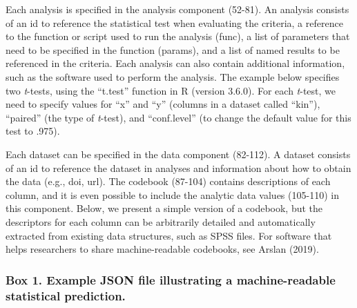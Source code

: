 \documentclass[doc,floatsintext]{apa6}
\begin{document}
Each analysis is specified in the analysis component (52-81). An analysis consists of an id to reference the statistical test when evaluating the criteria, a reference to the function or script used to run the analysis (func), a list of parameters that need to be specified in the function (params), and a list of named results to be referenced in the criteria. Each analysis can also contain additional information, such as the software used to perform the analysis. The example below specifies two \emph{t}-tests, using the \enquote{t.test} function in R (version 3.6.0). For each \emph{t}-test, we need to specify values for \enquote{x} and \enquote{y} (columns in a dataset called \enquote{kin}), \enquote{paired} (the type of \emph{t}-test), and \enquote{conf.level} (to change the default value for this test to .975).

Each dataset can be specified in the data component (82-112). A dataset consists of an id to reference the dataset in analyses and information about how to obtain the data (e.g., doi, url). The codebook (87-104) contains descriptions of each column, and it is even possible to include the analytic data values (105-110) in this component. Below, we present a simple version of a codebook, but the descriptors for each column can be arbitrarily detailed and automatically extracted from existing data structures, such as SPSS files. For software that helps researchers to share machine-readable codebooks, see Arslan (2019).
\newpage

\hypertarget{box-1.-example-json-file-illustrating-a-machine-readable-statistical-prediction.}{%
\subsubsection{Box 1. Example JSON file illustrating a machine-readable statistical prediction.}\label{box-1.-example-json-file-illustrating-a-machine-readable-statistical-prediction.}}
\end{document}
